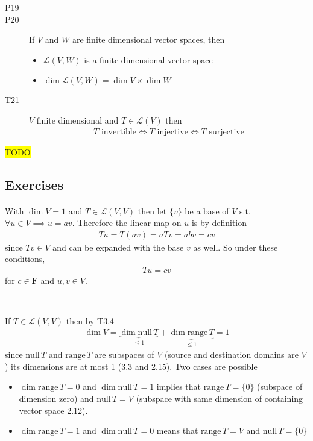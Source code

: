 \documentclass[11pt,notitlepage,oneside]{article}
\newcommand{\hilight}[1]{\colorbox{yellow}{#1}}
\newcommand{\exo}[1]{%
\addtocontents{toc}{\protect\setcounter{tocdepth}{2}}%
\paragraph{#1}}
\newcommand{\nullspace}[1]{\mathrm{null}\,{#1}}
\newcommand{\rangespace}[1]{\mathrm{range}\,{#1}}
\begin{document}
\begin{description}
  \item[P19]
  
  \item[P20\label{itm:P3_20}] If $V$ and $W$ are finite dimensional vector spaces, then
  \begin{itemize}
  \item $\mathcal{L}(V,W)$ is a finite dimensional vector space
  \item $\dim{\mathcal{L}(V,W)} = \dim{V} \times \dim{W}$
  \end{itemize}
  
  \item[T21\label{itm:T3_21}] $V$ finite dimensional and $T\in\mathcal{L}(V)$ then
  \begin{align*}
  T \text{ invertible} \iff T \text{ injective} \iff T \text{ surjective} 
  \end{align*}
  
  
  \end{description}
  
  \hilight{TODO}
  
  \subsection*{Exercises}
  \setcounter{paragraph}{0}
  
  \exo{} With $\dim{V}=1$ and $T\in\mathcal{L}(V,V)$ then let $\{v\}$ be a base of $V$ s.t. $\forall u\in V \implies u=av$. 
  Therefore the linear map on $u$ is by definition
  \begin{align*}
    Tu = T(av) = a Tv = abv = cv
  \end{align*}
  since $Tv \in V$ and can be expanded with the base $v$ as well. So under these conditions, 
  \begin{align*}
    Tu = c v
  \end{align*}
for $c\in\mathbf{F}$ and $u,v\in V$.
  
  ---

  If $T \in \mathcal{L}(V,V)$ then by T3.4
  \begin{align*}
  \dim{V} = \underbrace{\dim{\nullspace{T}}}_{\leq 1} + \underbrace{\dim{\rangespace{T}}}_{\leq 1} = 1
  \end{align*}
  since $\nullspace{T}$ and $\rangespace{T}$ are subspaces of $V$ (source and destination domains are $V$) its dimensions are at most 1 (3.3 and 2.15). Two cases are possible
  \begin{itemize}
  \item $\dim{\rangespace{T}}=0$ and $\dim{\nullspace{T}}=1$ implies that $\rangespace{T}=\{0\}$ (subspace of dimension zero) and $\nullspace{T}=V$ (subspace with same dimension of containing vector space 2.12).
  \item $\dim{\rangespace{T}}=1$ and $\dim{\nullspace{T}}=0$ means that $\rangespace{T}=V$ and $\nullspace{T}=\{0\}$ 
  \end{itemize}
  
\end{document}
